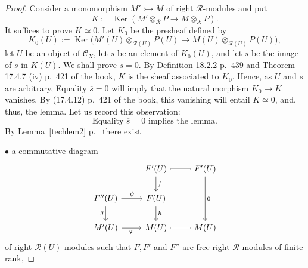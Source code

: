 \documentclass[12pt]{article}
\theoremstyle{remark}
\theoremstyle{definition}
\newcommand{\bu}{\bullet}
\newcommand{\nn}{\noindent}
\newcommand{\cc}{\mathcal}
\newcommand{\C}{\mathcal C}
\newcommand{\pp}{\varphi}
\newcommand{\mono}{\rightarrowtail}
\DeclareMathOperator{\Ker}{Ker}
\begin{document}
\begin{proof}
Consider a monomorphism $M'\mono M$ of right $\cc R$-modules and put 
$$ 
K:=\Ker(M'\otimes_{\cc R}P\to M\otimes_{\cc R}P).
$$ 
It suffices to prove $K\simeq0$. Let $K_0$ be the presheaf defined by 
$$
K_0(U):=\Ker\Big(M'(U)\otimes_{\cc R(U)}P(U)\to M(U)\otimes_{\cc R(U)}P(U)\Big),
$$ 
let $U$ be an object of $\C_X$, let $s$ be an element of $K_0(U)$, and let $\overline s$ be the image of $s$ in $K(U)$. We shall prove $\overline s=0$. By Definition 18.2.2 p.~439 and Theorem 17.4.7 (iv) p.~421 of the book, $K$ is the sheaf associated to $K_0$. Hence, as $U$ and $s$ are arbitrary, Equality $\overline s=0$ will imply that the natural morphism $K_0\to K$ vanishes. By (17.4.12) p.~421 of the book, this vanishing will entail $K\simeq0$, and, thus, the lemma. Let us record this observation: 
%
\begin{equation}\label{s=0il}
\text{Equality $\overline s=0$ implies the lemma.}
\end{equation}  
%  
By Lemma~\ref{techlem2} p.~\pageref{techlem2} there exist 

\nn$\bu$ a commutative diagram 
$$
\begin{tikzcd}
{}&F'(U)\ar{d}{f}\ar[equal]{r}&F'(U)\ar{dd}{0}\\ 
F''(U)\ar{r}{\psi}\ar{d}[swap]{g}&F(U)\ar{d}{h}\\ 
M'(U)\ar{r}[swap]{\pp}&M(U)\ar[equal]{r}&M(U)
\end{tikzcd}
$$  
of right $\cc R(U)$-modules such that $F,F'$ and $F''$ are free right $\cc R$-modules of finite rank,  


\end{proof}
\end{document}
